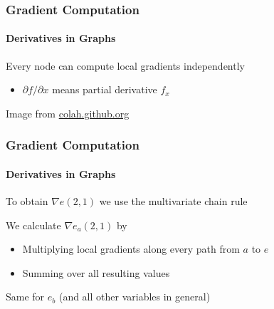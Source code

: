 \documentclass[xetex,professionalfont]{beamer}
\renewcommand\emph[1]{\textcolor{tuwcvl_cvl_blue}{#1}}
\begin{document}
\begin{frame}
\frametitle{Gradient Computation}
\framesubtitle{Derivatives in Graphs}

Every node can compute \emph{local gradients} independently
\begin{itemize}
    \item $\partial f/\partial x$ means partial derivative $f_x$ %
\end{itemize}


\medskip

\begin{center}
    {\centering Image from \href{https://colah.github.io/posts/2015-08-Backprop/}{colah.github.org}}
\end{center}

\end{frame}


\begin{frame}
\frametitle{Gradient Computation}
\framesubtitle{Derivatives in Graphs}

To obtain $\nabla e(2,1)$ we use the multivariate chain rule

\bigskip

We calculate $\nabla e_a(2,1)$ by
\begin{itemize}
    \item Multiplying local gradients along every path from $a$ to $e$
    \item Summing over all resulting values
\end{itemize}

\bigskip

Same for $e_b$ (and all other variables in general) %

\end{frame}
\end{document}

